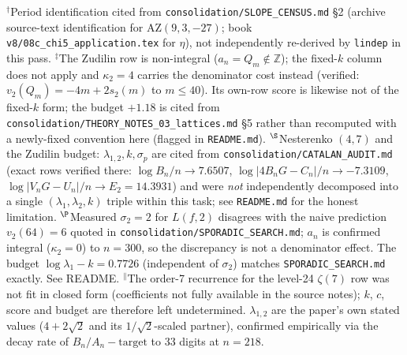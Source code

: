 \begin{table}[t]
\vspace{2mm}
\footnotesize
$^{\dagger}$Period identification cited from \texttt{consolidation/SLOPE\_CENSUS.md} \S2
(archive source-text identification for AZ$(9,3,-27)$; book \texttt{v8/08c\_chi5\_application.tex}
for $\eta$), not independently re-derived by \texttt{lindep} in this pass.
$^{\ddagger}$The Zudilin row is non-integral ($a_n=Q_m\notin\mathbb Z$); the fixed-$k$ column does not
apply and $\kappa_2=4$ carries the denominator cost instead (verified: $v_2(Q_m)=-4m+2s_2(m)$ to
$m\le40$). Its own-row score is likewise not of the fixed-$k$ form; the budget $+1.18$ is cited
from \texttt{consolidation/THEORY\_NOTES\_03\_lattices.md} \S5 rather than recomputed with a
newly-fixed convention here (flagged in \texttt{README.md}).
$^{\S}$Nesterenko $(4,7)$ and the Zudilin budget: $\lambda_{1,2},k,\sigma_p$ are cited from
\texttt{consolidation/CATALAN\_AUDIT.md} (exact rows verified there: $\log B_n/n\to7.6507$,
$\log|4B_nG-C_n|/n\to-7.3109$, $\log|V_nG-U_n|/n\to E_2{=}14.3931$) and were \emph{not}
independently decomposed into a single $(\lambda_1,\lambda_2,k)$ triple within this task; see
\texttt{README.md} for the honest limitation.
$^{\P}$Measured $\sigma_2=2$ for $L(f,2)$ disagrees with the naive prediction $v_2(64)=6$ quoted
in \texttt{consolidation/SPORADIC\_SEARCH.md}; $a_n$ is confirmed integral ($\kappa_2=0$) to
$n=300$, so the discrepancy is not a denominator effect. The budget $\log\lambda_1-k=0.7726$
(independent of $\sigma_2$) matches \texttt{SPORADIC\_SEARCH.md} exactly. See README.
$^{\parallel}$The order-7 recurrence for the level-24 $\zeta(7)$ row was not fit in closed form
(coefficients not fully available in the source notes); $k$, $c$, score and budget are therefore
left undetermined. $\lambda_{1,2}$ are the paper's own stated values ($4+2\sqrt2$ and its
$1/\sqrt2$-scaled partner), confirmed empirically via the decay rate of $B_n/A_n-\text{target}$
to 33 digits at $n=218$.
\end{table}
